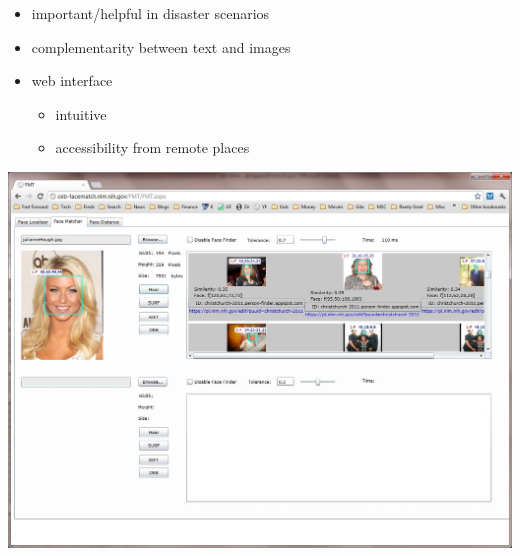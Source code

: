 
\begin{xpsectionbox}{}{}

\begin{minipage}{0.4\linewidth}
\begin{itemize}
	\item important/helpful in disaster scenarios
	\item complementarity between text and images
	\item web interface
		\begin{itemize}
			\item intuitive
			\item accessibility from remote places
		\end{itemize}
\end{itemize}
\end{minipage}
\begin{minipage}{0.6\linewidth}
\begin{center}
	\includegraphics[height=0.5\linewidth]{images/web_interface}
\end{center}
\end{minipage}


\end{xpsectionbox}
